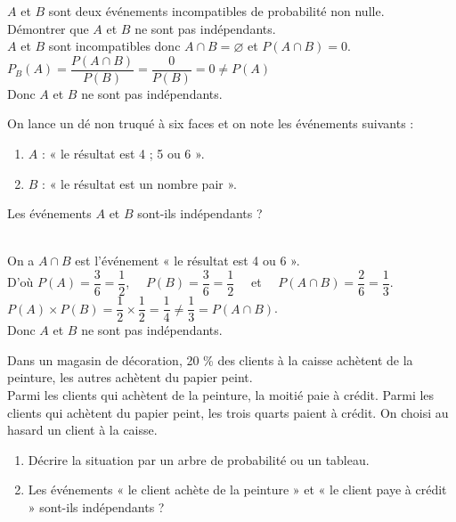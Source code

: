 \documentclass[a4paper,11pt,exos]{nsi} %
\begin{document}
\exo{ \faStar}
\textcolor{UGLiBlue}{$A$ et $B$ sont deux événements incompatibles de probabilité non nulle.\\
Démontrer que $A$ et $B$ ne sont pas indépendants.}\\

$A$ et $B$ sont incompatibles donc $A\cap B=\varnothing$ et $P(A\cap B)=0$.\\
$P_B(A)=\dfrac{P(A\cap B)}{P(B)}=\dfrac{0}{P(B)}=0\neq P(A)$\\
Donc $A$ et $B$ ne sont pas indépendants.

\exo{}
\textcolor{UGLiBlue}{On lance un dé non truqué à six faces et on note les événements suivants :
\begin{enumerate}[label=\textbullet]
    \item $A$ : « le résultat est 4 ; 5 ou 6 ».
    \item $B$ : « le résultat est un nombre pair ».
\end{enumerate}
Les événements $A$ et $B$ sont-ils indépendants ?}\\

On a $A\cap B$ est l'événement « le résultat est 4 ou 6 ».\\[.5em]
D'où $P(A)=\dfrac{3}{6}=\dfrac{1}{2}$, $\quad P(B)=\dfrac{3}{6}=\dfrac{1}{2}\quad$ et $\quad P(A\cap B)=\dfrac{2}{6}=\dfrac{1}{3}$.\\[.5em]
$P(A)\times P(B)=\dfrac{1}{2}\times \dfrac{1}{2}=\dfrac{1}{4}\neq \dfrac{1}{3}=P(A\cap B)$.\\[.5em]
Donc $A$ et $B$ ne sont pas indépendants.

\exo{}
\textcolor{UGLiBlue}{Dans un magasin de décoration, 20 \% des clients à la caisse achètent de la peinture, les autres achètent du papier peint.\\
Parmi les clients qui achètent de la peinture, la moitié paie à crédit. Parmi les clients qui achètent du papier peint, les trois quarts paient à crédit.
On choisi au hasard un client à la caisse.
\begin{enumerate}
    \item Décrire la situation par un arbre de probabilité ou un tableau.
    \item Les événements « le client achète de la peinture » et « le client paye à crédit » sont-ils indépendants ?
\end{enumerate}}
\end{document}
